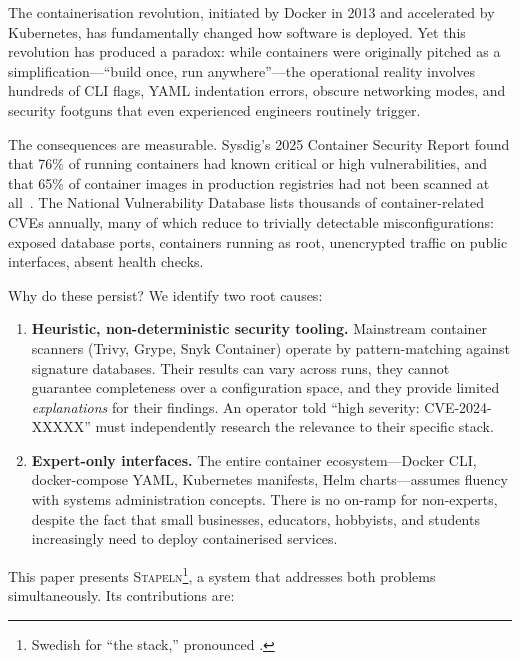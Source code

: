 \documentclass[11pt,twocolumn]{article}
\newcommand{\stapeln}{\textsc{Stapeln}\xspace}
\begin{document}
The containerisation revolution, initiated by Docker in 2013 and
accelerated by Kubernetes, has fundamentally changed how software is
deployed. Yet this revolution has produced a paradox: while containers
were originally pitched as a simplification---``build once, run
anywhere''---the operational reality involves hundreds of CLI flags,
YAML indentation errors, obscure networking modes, and security
footguns that even experienced engineers routinely trigger.

The consequences are measurable. Sysdig's 2025 Container Security
Report found that 76\% of running containers had known critical or high
vulnerabilities, and that 65\% of container images in production
registries had not been scanned at all~\cite{sysdig2025}. The
National Vulnerability Database lists thousands of container-related
CVEs annually, many of which reduce to trivially detectable
misconfigurations: exposed database ports, containers running as root,
unencrypted traffic on public interfaces, absent health checks.

Why do these persist? We identify two root causes:

\begin{enumerate}[leftmargin=*]
\item \textbf{Heuristic, non-deterministic security tooling.}
      Mainstream container scanners (Trivy, Grype, Snyk Container)
      operate by pattern-matching against signature databases. Their
      results can vary across runs, they cannot guarantee completeness
      over a configuration space, and they provide limited
      \emph{explanations} for their findings. An operator told ``high
      severity: CVE-2024-XXXXX'' must independently research the
      relevance to their specific stack.

\item \textbf{Expert-only interfaces.} The entire container
      ecosystem---Docker CLI, docker-compose YAML, Kubernetes
      manifests, Helm charts---assumes fluency with systems
      administration concepts. There is no on-ramp for non-experts,
      despite the fact that small businesses, educators, hobbyists,
      and students increasingly need to deploy containerised services.
\end{enumerate}

This paper presents \stapeln\footnote{Swedish for ``the stack,''
pronounced .},
a system that addresses both problems simultaneously. Its contributions are:
\end{document}
